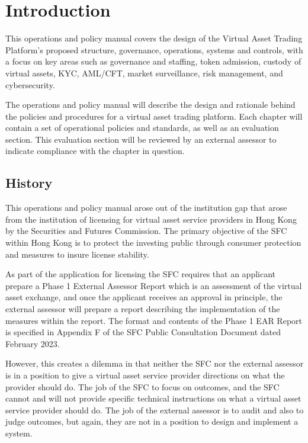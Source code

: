 \chapter{Introduction}

This operations and policy manual covers the design of
the Virtual Asset Trading Platform's proposed structure, governance,
operations, systems and controls, with a focus on key areas such as
governance and staffing, token admission, custody of virtual assets,
KYC, AML/CFT, market surveillance, risk management, and cybersecurity.

The operations and policy manual will describe the design and
rationale behind the policies and procedures for a virtual asset
trading platform.  Each chapter will contain a set of operational
policies and standards, as well as an evaluation section.  This
evaluation section will be reviewed by an external assessor to
indicate compliance with the chapter in question.

\section{History}

This operations and policy manual arose out of the institution gap
that arose from the institution of licensing for virtual asset service
providers in Hong Kong by the Securities and Futures Commission.  The
primary objective of the SFC within Hong Kong is to protect the
investing public through consumer protection and measures to insure
license stability.

As part of the application for licensing the SFC requires that an
applicant prepare a Phase 1 External Assessor Report which is an
assessment of the virtual asset exchange, and once the applicant
receives an approval in principle, the external assessor will prepare
a report describing the implementation of the measures within the
report.  The format and contents of the Phase 1 EAR Report is
specified in Appendix F of the SFC Public Consultation Document dated
February 2023.

However, this creates a dilemma in that neither the SFC nor the
external assessor is in a position to give a virtual asset service
provider directions on what the provider should do.  The job of the
SFC to focus on outcomes, and the SFC cannot and will not provide
specific technical instructions on what a virtual asset service
provider should do.  The job of the external assessor is to audit and
also to judge outcomes, but again, they are not in a position to
design and implement a system.

